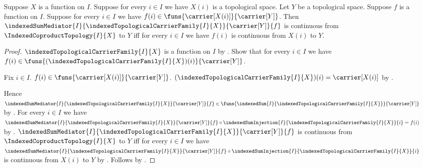 \begin{theorem}\label{indexed_coproduct_mediator_continuous_iff}
    Suppose $X$ is a function on $I$.
    Suppose for every $i\in I$ we have $X(i)$ is a topological space.
    Let $Y$ be a topological space.
    Suppose $f$ is a function on $I$.
    Suppose for every $i\in I$ we have
        $f(i)\in\funs{\carrier[X(i)]}{\carrier[Y]}$.
    Then $\indexedSumMediator{I}{
        \indexedTopologicalCarrierFamily{I}{X}}{\carrier[Y]}{f}$
        is continuous from $\IndexedCoproductTopology{I}{X}$ to $Y$ iff
        for every $i\in I$ we have
            $f(i)$ is continuous from $X(i)$ to $Y$.
\end{theorem}
\begin{proof}
    $\indexedTopologicalCarrierFamily{I}{X}$ is a function on $I$ by
        .
    Show that for every $i\in I$ we have
        $f(i)\in\funs{
            (\indexedTopologicalCarrierFamily{I}{X})(i)}{\carrier[Y]}$.
    \begin{subproof}
        Fix $i\in I$.
        $f(i)\in\funs{\carrier[X(i)]}{\carrier[Y]}$.
        $(\indexedTopologicalCarrierFamily{I}{X})(i)
            =\carrier[X(i)]$ by
            .
    \end{subproof}
    Hence $\indexedSumMediator{I}{
        \indexedTopologicalCarrierFamily{I}{X}}{\carrier[Y]}{f}
        \in\funs{
            \indexedSum{I}{
                \indexedTopologicalCarrierFamily{I}{X}}}{\carrier[Y]}$ by
        .
    For every $i\in I$ we have
        $\indexedSumMediator{I}{
            \indexedTopologicalCarrierFamily{I}{X}}{\carrier[Y]}{f}
        \circ\indexedSumInjection{I}{
            \indexedTopologicalCarrierFamily{I}{X}}{i}=f(i)$ by
        .
    $\indexedSumMediator{I}{
        \indexedTopologicalCarrierFamily{I}{X}}{\carrier[Y]}{f}$
        is continuous from $\IndexedCoproductTopology{I}{X}$ to $Y$ iff
        for every $i\in I$ we have
            $\indexedSumMediator{I}{
                \indexedTopologicalCarrierFamily{I}{X}}{\carrier[Y]}{f}
            \circ\indexedSumInjection{I}{
                \indexedTopologicalCarrierFamily{I}{X}}{i}$
            is continuous from $X(i)$ to $Y$ by
        .
    Follows by \auto.
\end{proof}
